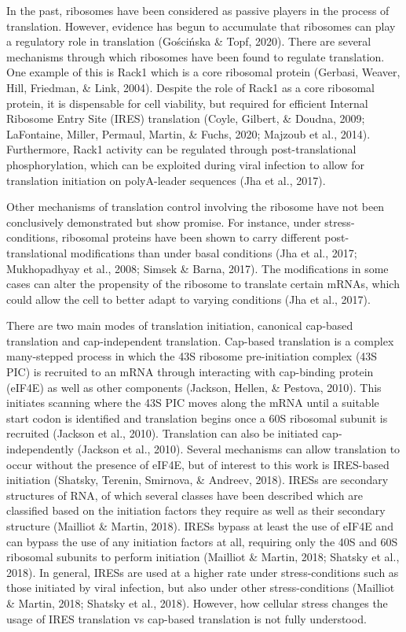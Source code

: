 \documentclass[12pt,oneside]{reedthesis}
\begin{document}
In the past, ribosomes have been considered as passive players in the
process of translation. However, evidence has begun to accumulate that
ribosomes can play a regulatory role in translation
(Gościńska \& Topf, 2020). There are several mechanisms
through which ribosomes have been found to regulate translation. One
example of this is Rack1 which is a core ribosomal protein
(Gerbasi, Weaver, Hill, Friedman, \& Link, 2004). Despite the role of Rack1 as a
core ribosomal protein, it is dispensable for cell viability, but
required for efficient Internal Ribosome Entry Site (IRES) translation
(Coyle, Gilbert, \& Doudna, 2009; LaFontaine, Miller, Permaul, Martin, \& Fuchs, 2020; Majzoub et al., 2014). Furthermore, Rack1 activity
can be regulated through post-translational phosphorylation, which can be
exploited during viral infection to allow for translation initiation on
polyA-leader sequences (Jha et al., 2017).

Other mechanisms of translation control involving the ribosome have not
been conclusively demonstrated but show promise. For instance, under
stress-conditions, ribosomal proteins have been shown to carry different
post-translational modifications than under basal conditions
(Jha et al., 2017; Mukhopadhyay et al., 2008; Simsek \& Barna, 2017). The modifications in some cases can
alter the propensity of the ribosome to translate certain mRNAs, which
could allow the cell to better adapt to varying conditions
(Jha et al., 2017).

There are two main modes of translation initiation, canonical cap-based
translation and cap-independent translation. Cap-based translation is a
complex many-stepped process in which the 43S ribosome pre-initiation
complex (43S PIC) is recruited to an mRNA through interacting with
cap-binding protein (eIF4E) as well as other components
(Jackson, Hellen, \& Pestova, 2010). This initiates scanning
where the 43S PIC moves along the mRNA until a suitable start codon is
identified and translation begins once a 60S ribosomal subunit is
recruited (Jackson et al., 2010). Translation
can also be initiated cap-independently
(Jackson et al., 2010). Several mechanisms can
allow translation to occur without the presence of eIF4E, but of
interest to this work is IRES-based initiation
(Shatsky, Terenin, Smirnova, \& Andreev, 2018). IRESs are secondary
structures of RNA, of which several classes have been described which are
classified based on the initiation factors they require as well as their
secondary structure (Mailliot \& Martin, 2018). IRESs
bypass at least the use of eIF4E and can bypass the use of any
initiation factors at all, requiring only the 40S and 60S ribosomal
subunits to perform initiation (Mailliot \& Martin, 2018; Shatsky et al., 2018). In general, IRESs are used
at a higher rate under stress-conditions such as those initiated by
viral infection, but also under other stress-conditions
(Mailliot \& Martin, 2018; Shatsky et al., 2018). However, how cellular
stress changes the usage of IRES translation vs cap-based translation is
not fully understood.
\end{document}

